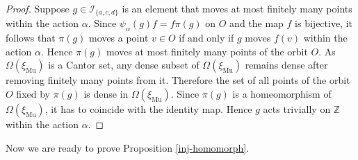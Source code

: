 \documentclass[12pt]{article}
\theoremstyle{definition}
\def\bZ{\mathbb{Z}}
\def\cI{\mathcal{I}}
\def\al{\alpha}
\def\Om{\Omega}
\def\xiGE{\xi_{\mathrm{Mu}}}
\begin{document}
\begin{proof}
Suppose $g\in\cI_{\{a,c,d\}}$ is an element that moves at most finitely 
many points within the action $\al$.  Since $\psi_\al(g)f=f\pi(g)$ on $O$ 
and the map $f$ is bijective, it follows that $\pi(g)$ moves a point $v\in 
O$ if and only if $g$ moves $f(v)$ within the action $\al$.  Hence $\pi(g)$ 
moves at most finitely many points of the orbit $O$.  As $\Om(\xiGE)$ is a 
Cantor set, any dense subset of $\Om(\xiGE)$ remains dense after removing 
finitely many points from it.  Therefore the set of all points of the orbit 
$O$ fixed by $\pi(g)$ is dense in $\Om(\xiGE)$.  Since $\pi(g)$ is a 
homeomorphism of $\Om(\xiGE)$, it has to coincide with the identity map.  
Hence $g$ acts trivially on $\bZ$ within the action $\al$.
\end{proof}

Now we are ready to prove Proposition \ref{inj-homomorph}.
\end{document}
